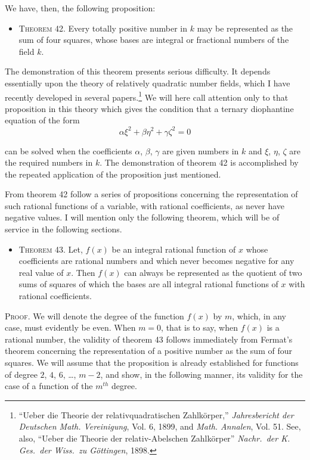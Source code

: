 \documentclass[11pt,oneside]{book}
\begin{document}
We have, then, the following proposition:
\begin{itemize}
\item[]{\scshape Theorem 42.} Every totally positive number in $k$
may be represented as the sum of four squares,
whose bases are integral or fractional numbers
of the field $k$.
\end{itemize}
The demonstration of this theorem presents serious
difficulty. It depends essentially upon the theory
of relatively quadratic number fields, which I have
recently developed in several papers.\footnote{``Ueber
die Theorie der relativquadratischen Zahlk\"orper,'' {\em Jahresbericht
der Deutschen Math. Vereinigung}, Vol. 6, 1899, and {\em Math. Annalen}, Vol.
51. See, also, ``Ueber die Theorie der relativ-Abelschen Zahlk\"orper'' {\em Nachr.\ der
K. Ges.\ der Wiss.\ zu G\"ottingen}, 1898.
}
 We will here
call attention only to that proposition in this theory
which gives the condition that a ternary diophantine
equation of the form
\[
\alpha\xi^2 + \beta\eta^2 + \gamma\zeta^2 = 0
\]

can be solved when the coefficients $\alpha$, $\beta$, $\gamma$ are given
numbers in $k$ and $\xi$, $\eta$, $\zeta$ are the required numbers in
$k$. The demonstration of theorem 42 is accomplished
by the repeated application of the proposition just
mentioned.

From theorem 42 follow a series of propositions
concerning the representation of such rational functions
of a variable, with rational coefficients, as never
have negative values. I will mention only the following
theorem, which will be of service in the following
sections.

\begin{itemize}
\item[]{\scshape Theorem 43.} Let, $f(x)$ be an integral rational function
of $x$ whose coefficients are rational numbers
and which never becomes negative for any
real value of $x$. Then $f(x)$ can always be represented
as the quotient of two sums of squares
of which the bases are all integral rational functions
of $x$ with rational coefficients.
\end{itemize}

{\scshape Proof}. We will denote the degree of the function
$f(x)$ by $m$, which, in any case, must evidently be even.
When $m = 0$, that is to say, when $f(x)$ is a rational
number, the validity of theorem 43 follows immediately
from Fermat's theorem concerning the representation
of a positive number as the sum of four
squares. We will assume that the proposition is already
established for functions of degree $2$, $4$, $6$, \ldots,
$m-2$, and show, in the following manner, its validity
for the case of a function of the $m^{th}$ degree.
\end{document}
